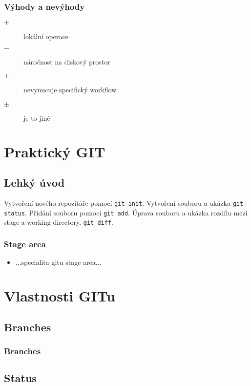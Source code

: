 \begin{frame}
	\frametitle{Výhody a nevýhody}
	\begin{description}
		\item[$+$]{lokální operace}
		\item[$-$]{náročnost na diskový prostor}
		\item[$\pm$]{nevynucuje specifický workflow}
		\item[$\pm$]{je to jiné}
	\end{description}
\end{frame}

\section{Praktický GIT}
\subsection{Lehký úvod}

\begin{frame}
Vytvoření nového repozitáře pomocí \texttt{git init}.
Vytvoření souboru a ukázka \texttt{git status}.
Přidání souboru pomocí \texttt{git add}.
Úprava souboru a ukázka rozdílu mezi stage a working directory.
\texttt{git diff}.
\end{frame}


\begin{frame}
	\frametitle{Stage area}
	\begin{itemize}
		\item{...specialita gitu stage area...}
	\end{itemize}
\end{frame}

\section{Vlastnosti GITu}
\subsection{Branches}


\begin{frame}
	\frametitle{Branches}
\end{frame}

\subsection{Status}

